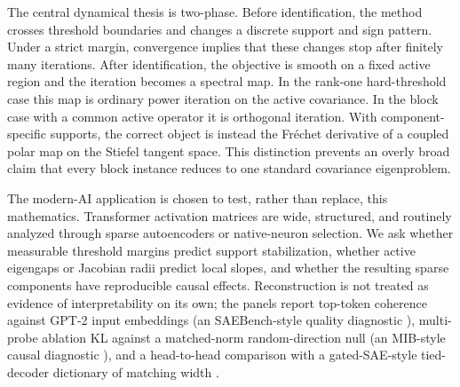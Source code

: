 The central dynamical thesis is two-phase. Before identification, the method crosses threshold boundaries and changes a discrete support and sign pattern. Under a strict margin, convergence implies that these changes stop after finitely many iterations. After identification, the objective is smooth on a fixed active region and the iteration becomes a spectral map. In the rank-one hard-threshold case this map is ordinary power iteration on the active covariance. In the block case with a common active operator it is orthogonal iteration. With component-specific supports, the correct object is instead the Fr\'echet derivative of a coupled polar map on the Stiefel tangent space. This distinction prevents an overly broad claim that every block instance reduces to one standard covariance eigenproblem.

The modern-AI application is chosen to test, rather than replace, this mathematics. Transformer activation matrices are wide, structured, and routinely analyzed through sparse autoencoders or native-neuron selection. We ask whether measurable threshold margins predict support stabilization, whether active eigengaps or Jacobian radii predict local slopes, and whether the resulting sparse components have reproducible causal effects. Reconstruction is not treated as evidence of interpretability on its own; the  panels report top-token coherence against GPT-2 input embeddings (an SAEBench-style quality diagnostic \citep{karvonen2025saebench}), multi-probe ablation KL against a matched-norm random-direction null (an MIB-style causal diagnostic \citep{mueller2025mib,oneill2025compute}), and a head-to-head comparison with a gated-SAE-style tied-decoder dictionary of matching width \citep{rajamanoharan2024gated}.

